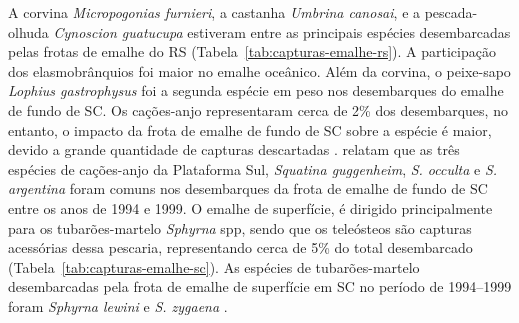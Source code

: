 \documentclass[a4paper,11pt,twoside,showtrims,onecolumn,openright,final]{memoir}
\begin{document}
A corvina \emph{Micropogonias furnieri}, a castanha \emph{Umbrina canosai}, 
e a pescada-olhuda \emph{Cynoscion guatucupa} estiveram entre as principais 
espécies desembarcadas pelas frotas de emalhe do RS (Tabela~\ref{tab:capturas-emalhe-rs}).
A participação dos elasmobrânquios foi maior no emalhe oceânico. Além da corvina,
o peixe-sapo \emph{Lophius gastrophysus} foi a segunda espécie em peso
nos desembarques do emalhe de fundo de SC. Os cações-anjo representaram cerca de 2\% dos
desembarques, no entanto, o impacto da frota de emalhe de fundo de SC sobre a espécie
é maior, devido a grande quantidade de capturas descartadas \citep{perez2005}.
\citet{mazzoleni1999} relatam que as três espécies de cações-anjo da Plataforma Sul, 
\emph{Squatina guggenheim}, \emph{S. occulta} e \emph{S. argentina} foram
comuns nos desembarques da frota de emalhe de fundo de SC entre os anos de 1994 e 1999.
O emalhe de superfície, é dirigido principalmente para os tubarões-martelo
\emph{Sphyrna} spp, sendo que os teleósteos são capturas acessórias dessa pescaria, 
representando cerca de 5\% do total desembarcado (Tabela~\ref{tab:capturas-emalhe-sc}).
As espécies de tubarões-martelo desembarcadas pela frota de emalhe de superfície em SC
no período de 1994--1999 foram \emph{Sphyrna lewini} e \emph{S. zygaena} \citep{mazzoleni1999}.

\end{document}
